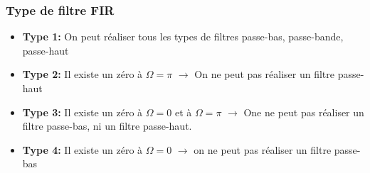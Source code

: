 \documentclass[9pt]{article}
\begin{document}
\begin{multicols}{2}
\subsubsection{Type de filtre FIR}
\begin{itemize}
    \item \textbf{Type 1:} On peut réaliser tous les types de filtres passe-bas, passe-bande, passe-haut
    \item \textbf{Type 2:} Il existe un zéro à $ \Omega = \pi  $ $\rightarrow$ On ne peut pas réaliser un filtre passe-haut
    \item \textbf{Type 3:} Il existe un zéro à $ \Omega = 0 $ et à $ \Omega = \pi  $ $\rightarrow$ One ne peut pas réaliser un filtre passe-bas, ni un filtre passe-haut.
    \item \textbf{Type 4:} Il existe un zéro à $ \Omega = 0 $ $\rightarrow$ on ne peut pas réaliser un filtre passe-bas
\end{itemize}
\end{multicols}
\end{document}
